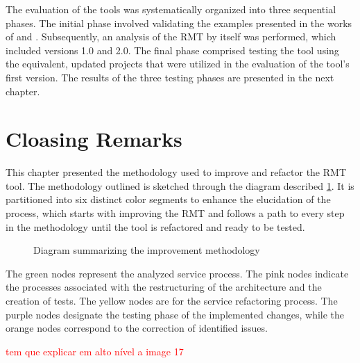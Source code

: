 The evaluation of the tools was systematically organized into three sequential phases. The initial phase involved validating the examples presented in the works of \textcite{liu2014automated} and \cite{zafeiris2017automated}. Subsequently, an analysis of the RMT by itself was performed, which included versions 1.0 and 2.0. The final phase comprised testing the tool using the equivalent, updated projects that were utilized in the evaluation of the tool's first version. The results of the three testing phases are presented in the next chapter.

\section{Cloasing Remarks}

This chapter presented the methodology used to improve and refactor the RMT tool. 
The methodology outlined is sketched through the diagram described \cref{fig-summarized-methodology}. It is partitioned into six distinct color segments to enhance the elucidation of the process, which starts with improving the RMT and follows a path to every step in the methodology until the tool is refactored and ready to be tested.

\begin{figure}[ht!]
\SetCaptionWidth{\textwidth}
\caption{Diagram summarizing the improvement methodology}
\label{fig-summarized-methodology}
\fontsize{3.8}{5}\selectfont

\end{figure}
\FloatBarrier

The green nodes represent the analyzed service process. The pink nodes indicate the processes associated with the restructuring of the architecture and the creation of tests. The yellow nodes are for the service refactoring process. The purple nodes designate the testing phase of the implemented changes, while the orange nodes correspond to the correction of identified issues.

\textcolor{red}{tem que explicar em alto nível a image 17}